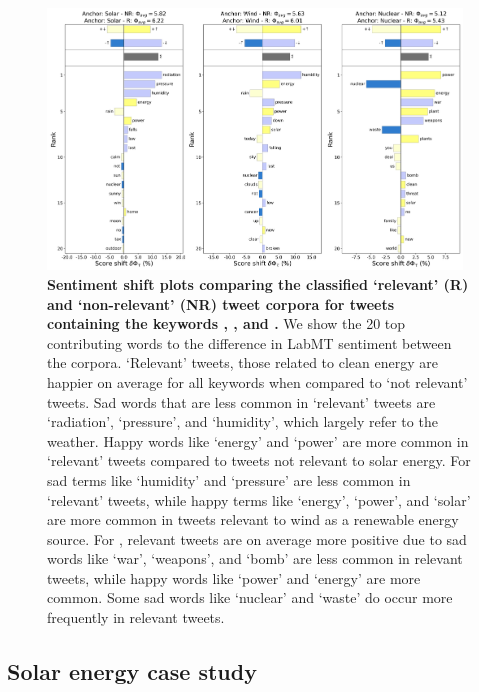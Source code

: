 \begin{figure}
  \centering	
    \includegraphics[width=0.98\textwidth]{figures/combined_shifts.png}  
  \caption{
    \textbf{Sentiment shift plots comparing the classified `relevant' (R) and `non-relevant' (NR) tweet corpora for tweets containing the keywords , , and .}
    We show the 20 top contributing words to the difference in LabMT sentiment between the corpora.
    `Relevant' tweets, those related to clean energy are happier on average for all keywords when compared to `not relevant' tweets. 
    Sad words that are less common in `relevant'  tweets are `radiation', `pressure', and `humidity', which largely refer to the weather. Happy words like `energy' and `power' are more common in `relevant' tweets compared to tweets not relevant to solar energy. For  sad terms like `humidity' and `pressure' are less common in `relevant' tweets, while happy terms like `energy', `power', and `solar' are more common in tweets relevant to wind as a renewable energy source. For , relevant tweets are on average more positive due to sad words like `war', `weapons', and `bomb' are less common in relevant tweets, while happy words like `power' and `energy' are more common. Some sad words like `nuclear' and `waste' do occur more frequently in relevant tweets.
  }    
  \label{fig:combined_sentiment_shifts}

\end{figure}

\subsection{Solar energy case study}
\label{sec:corpusCreation.results.solar}




